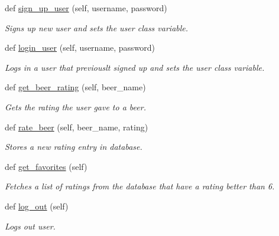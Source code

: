 \begin{DoxyCompactItemize}
def \hyperlink{classdb__comms_1_1comms_1_1_user_session_af8538019bc41b79dd46ea88625f32c3a}{sign\+\_\+up\+\_\+user} (self, username, password)
\begin{DoxyCompactList}\small\item\em Signs up new user and sets the user class variable. \end{DoxyCompactList}\item 
def \hyperlink{classdb__comms_1_1comms_1_1_user_session_abaa630b994846d5ffd0febcffa30f39b}{login\+\_\+user} (self, username, password)
\begin{DoxyCompactList}\small\item\em Logs in a user that previouslt signed up and sets the user class variable. \end{DoxyCompactList}\item 
def \hyperlink{classdb__comms_1_1comms_1_1_user_session_a05b7cbebe11ca82cc32102a3ea9feb95}{get\+\_\+beer\+\_\+rating} (self, beer\+\_\+name)
\begin{DoxyCompactList}\small\item\em Gets the rating the user gave to a beer. \end{DoxyCompactList}\item 
def \hyperlink{classdb__comms_1_1comms_1_1_user_session_a708b48a3a3abc80e1dd2b6849b5994a5}{rate\+\_\+beer} (self, beer\+\_\+name, rating)
\begin{DoxyCompactList}\small\item\em Stores a new rating entry in database. \end{DoxyCompactList}\item 
def \hyperlink{classdb__comms_1_1comms_1_1_user_session_a8c5c4fb09cf2300d76c57810ebd8fd46}{get\+\_\+favorites} (self)
\begin{DoxyCompactList}\small\item\em Fetches a list of ratings from the database that have a rating better than 6. \end{DoxyCompactList}\item 
def \hyperlink{classdb__comms_1_1comms_1_1_user_session_a937ba7bbe7304dd572e1877ae9a7d474}{log\+\_\+out} (self)
\begin{DoxyCompactList}\small\item\em Logs out user. \end{DoxyCompactList}\end{DoxyCompactItemize}
